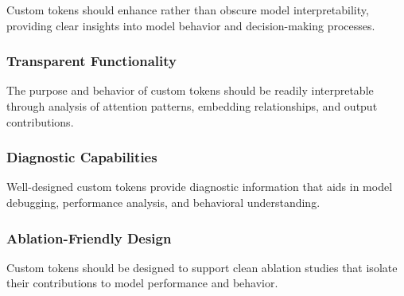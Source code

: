 Custom tokens should enhance rather than obscure model interpretability, providing clear insights into model behavior and decision-making processes.

\subsubsection{Transparent Functionality}

The purpose and behavior of custom tokens should be readily interpretable through analysis of attention patterns, embedding relationships, and output contributions.

\subsubsection{Diagnostic Capabilities}

Well-designed custom tokens provide diagnostic information that aids in model debugging, performance analysis, and behavioral understanding.

\subsubsection{Ablation-Friendly Design}

Custom tokens should be designed to support clean ablation studies that isolate their contributions to model performance and behavior.